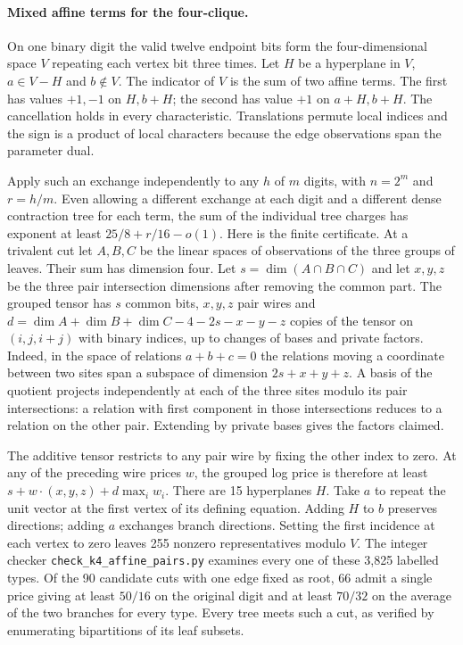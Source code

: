 \documentclass[11pt,letterpaper]{article}
\begin{document}
\paragraph{Mixed affine terms for the four-clique.}
On one binary digit the valid twelve endpoint bits form the four-dimensional
space \(V\) repeating each vertex bit three times. Let \(H\) be a hyperplane
in \(V\), \(a\in V-H\) and \(b\notin V\). The indicator of \(V\) is the
sum of two affine terms. The first has values \(+1,-1\) on \(H,b+H\);
the second has value \(+1\) on \(a+H,b+H\). The cancellation holds in
every characteristic. Translations permute local indices and the sign
is a product of local characters because the edge observations span
the parameter dual.

Apply such an exchange independently to any \(h\) of \(m\) digits, with
\(n=2^m\) and \(r=h/m\). Even allowing a different exchange at each digit
and a different dense contraction tree for each term, the sum of the
individual tree charges has exponent at least \(25/8+r/16-o(1)\).
Here is the finite certificate. At a trivalent cut let \(A,B,C\) be the
linear spaces of observations of the three groups of leaves.
Their sum has dimension four. Let \(s=\dim(A\cap B\cap C)\) and
let \(x,y,z\) be the three pair intersection dimensions after removing
the common part. The grouped tensor has \(s\) common bits, \(x,y,z\)
pair wires and \(d=\dim A+\dim B+\dim C-4-2s-x-y-z\) copies of the
tensor on \((i,j,i+j)\) with binary indices, up to changes of bases
and private factors. Indeed, in the space of relations \(a+b+c=0\)
the relations moving a coordinate between two sites span a subspace
of dimension \(2s+x+y+z\). A basis of the quotient projects independently
at each of the three sites modulo its pair intersections: a relation
with first component in those intersections reduces to a relation on
the other pair. Extending by private bases gives the factors claimed.

The additive tensor restricts to any pair wire by fixing the other index
to zero. At any of the preceding wire prices \(w\), the grouped log price
is therefore at least \(s+w\cdot(x,y,z)+d\max_i w_i\).
There are 15 hyperplanes \(H\). Take \(a\) to repeat the unit vector at
the first vertex of its defining equation. Adding \(H\) to \(b\) preserves
directions; adding \(a\) exchanges branch directions. Setting the first
incidence at each vertex to zero leaves 255 nonzero representatives
modulo \(V\). The integer checker \texttt{check\_k4\_affine\_pairs.py}
examines every one of these 3,825 labelled types. Of the 90 candidate
cuts with one edge fixed as root, 66 admit a single price giving at
least \(50/16\) on the original digit and at least \(70/32\) on the
average of the two branches for every type. Every tree meets such a
cut, as verified by enumerating bipartitions of its leaf subsets.
\end{document}
